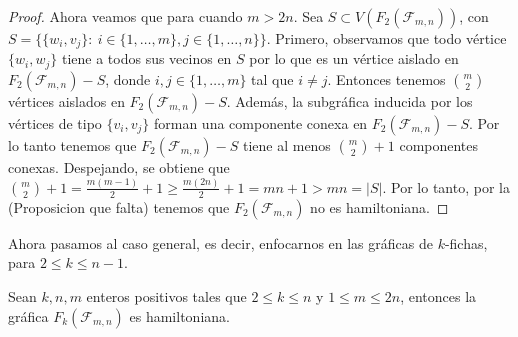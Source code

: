 \begin{proof}
Ahora veamos que para cuando $m>2n$. Sea $S \subset V(F_2(\mathcal{F}_{m,n}))$,
con $S=\{\{w_i,v_j\} \colon\ i \in \{1,\dots,m\},j\in\{1,\dots,n\}\}$. Primero,
observamos que todo v\'ertice $\{w_i,w_j\}$ tiene a todos sus vecinos en $S$ por
lo que es un v\'ertice aislado en $F_2(\mathcal{F}_{m,n})-S$, donde $i,j \in
\{1,\dots,m\}$ tal que $i \neq j$. Entonces tenemos $\binom{m}{2}$ v\'ertices
aislados en $F_2(\mathcal{F}_{m,n})-S$. Adem\'as, la subgr\'afica inducida por
los v\'ertices de tipo $\{v_i,v_j\}$ forman una componente conexa en
$F_2(\mathcal{F}_{m,n})-S$. Por lo tanto tenemos que $F_2(\mathcal{F}_{m,n})-S$
tiene al menos $\binom{m}{2} + 1$ componentes conexas. Despejando, se obtiene
que $\binom{m}{2} + 1 = \frac{m(m-1)}{2} + 1 \geq \frac{m(2n)}{2} + 1 = mn + 1 >
mn = |S|$. Por lo tanto, por la (Proposicion que falta) tenemos que
$F_2(\mathcal{F}_{m,n})$ no es hamiltoniana.

\end{proof}

Ahora pasamos al caso general, es decir, enfocarnos en las gr\'aficas de
$k$-fichas, para $2 \leq k \leq n-1$.

\begin{teorema}
\label{teo:TokGenerFan}
    Sean $k, n, m$ enteros positivos tales que $2 \leq k \leq n$ y $1 \leq m
       \leq 2n$, entonces la gr\'afica $F_k(\mathcal{F}_{m,n})$ es hamiltoniana.
\end{teorema}

